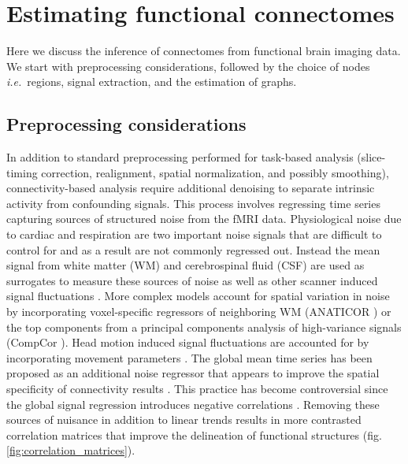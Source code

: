 \documentclass[5p]{elsarticle}
\begin{document}
\section{Estimating functional connectomes}

Here we discuss the inference of connectomes from functional brain
imaging data. We start with preprocessing considerations, followed by
the choice of nodes \emph{i.e.}\ regions,
signal extraction, and the estimation of graphs.  

\subsection{Preprocessing considerations}

In addition to standard preprocessing performed for task-based analysis
(slice-timing correction, realignment, spatial normalization, and possibly
smoothing), connectivity-based analysis require additional denoising 
to separate intrinsic activity from confounding signals. This process involves
regressing time series capturing sources of structured noise from the fMRI data.
Physiological noise due to cardiac and respiration are two important
noise signals \cite{hu1995, lund2006, birn2006, birn2008} that are
difficult to control for and as a result are not commonly regressed out. Instead
the mean signal from white matter (WM) and cerebrospinal fluid (CSF) are used as
surrogates to measure these sources of noise as well as other scanner induced
signal fluctuations \cite{fox2005, lund2006}. More complex models account for
spatial variation in noise by incorporating voxel-specific regressors of
neighboring WM (ANATICOR \cite{jo2010}) or the top components from a
principal
components analysis of high-variance signals (CompCor \cite{behzadi2007}). Head motion
induced signal fluctuations are accounted for by incorporating movement
parameters \cite{friston1996, fox2005, lund2006}. The global mean time series
has been proposed as an additional noise regressor that appears to improve the
spatial specificity of connectivity results \cite{fox2005, fox2009}. This practice
has become controversial since the global signal regression introduces negative correlations
\cite{murphy2009,chang2009,saad2012}. 
Removing these sources of
nuisance in addition to linear trends results in more contrasted
correlation matrices that improve the delineation of functional structures
(fig.\,\ref{fig:correlation_matrices}). 
\end{document}
